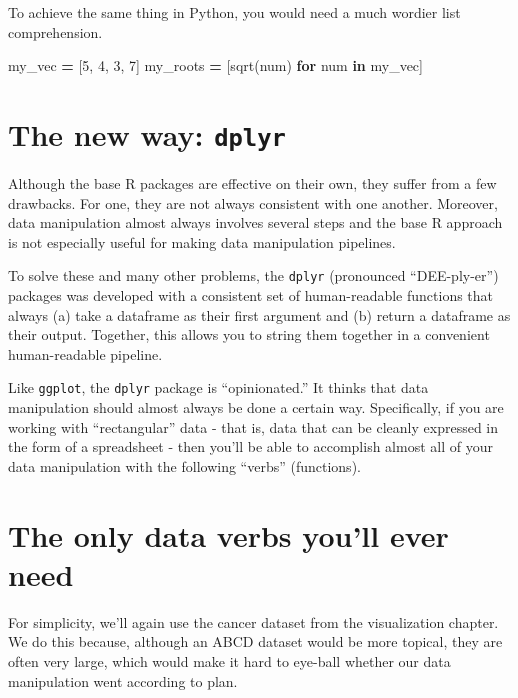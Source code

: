 \documentclass[
]{book}
\newenvironment{Shaded}{\begin{snugshade}}{\end{snugshade}}
\newcommand{\ControlFlowTok}[1]{\textcolor[rgb]{0.13,0.29,0.53}{\textbf{#1}}}
\newcommand{\DecValTok}[1]{\textcolor[rgb]{0.00,0.00,0.81}{#1}}
\newcommand{\KeywordTok}[1]{\textcolor[rgb]{0.13,0.29,0.53}{\textbf{#1}}}
\newcommand{\NormalTok}[1]{#1}
\newcommand{\OperatorTok}[1]{\textcolor[rgb]{0.81,0.36,0.00}{\textbf{#1}}}
\begin{document}
To achieve the same thing in Python, you would need a much wordier list comprehension.

\begin{Shaded}
\begin{Highlighting}[]
\NormalTok{my\_vec }\OperatorTok{=}\NormalTok{ [}\DecValTok{5}\NormalTok{, }\DecValTok{4}\NormalTok{, }\DecValTok{3}\NormalTok{, }\DecValTok{7}\NormalTok{]}
\NormalTok{my\_roots }\OperatorTok{=}\NormalTok{ [sqrt(num) }\ControlFlowTok{for}\NormalTok{ num }\KeywordTok{in}\NormalTok{ my\_vec]}
\end{Highlighting}
\end{Shaded}

\hypertarget{the-new-way-dplyr}{%
\section{\texorpdfstring{The new way: \texttt{dplyr}}{The new way: dplyr}}\label{the-new-way-dplyr}}

Although the base R packages are effective on their own, they suffer from a few drawbacks. For one, they are not always consistent with one another. Moreover, data manipulation almost always involves several steps and the base R approach is not especially useful for making data manipulation pipelines.

To solve these and many other problems, the \texttt{dplyr} (pronounced ``DEE-ply-er'') packages was developed with a consistent set of human-readable functions that always (a) take a dataframe as their first argument and (b) return a dataframe as their output. Together, this allows you to string them together in a convenient human-readable pipeline.

Like \texttt{ggplot}, the \texttt{dplyr} package is ``opinionated.'' It thinks that data manipulation should almost always be done a certain way. Specifically, if you are working with ``rectangular'' data - that is, data that can be cleanly expressed in the form of a spreadsheet - then you'll be able to accomplish almost all of your data manipulation with the following ``verbs'' (functions).

\hypertarget{the-only-data-verbs-youll-ever-need}{%
\section{The only data verbs you'll ever need}\label{the-only-data-verbs-youll-ever-need}}

For simplicity, we'll again use the cancer dataset from the visualization chapter. We do this because, although an ABCD dataset would be more topical, they are often very large, which would make it hard to eye-ball whether our data manipulation went according to plan.
\end{document}
